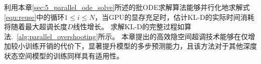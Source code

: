 利用本章\ref{sec:5_parallel_ode_solve}所述的批ODE求解算法能够并行化地求解式\eqref{equ:reuse}中的循环$1\leq i\leq N$，当GPU的显存充足时，估计KL-D的实际时间消耗将随着最大超调长度$D$线性增长。
求解KL-D的完整过程如算法.~\ref{alg:parallel_overshooting}所示。
本章提出的高效隐空间超调技术能够在仅增加较小训练开销的代价下，显著提升模型的多步预测能力，且该方法对于其他深度状态空间模型的训练同样具有适用性。



